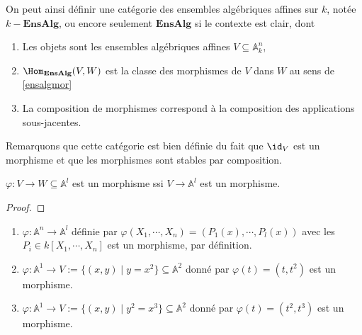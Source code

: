             On peut ainsi définir une catégorie des ensembles algébriques affines sur $k$, notée $k-\mathbf{EnsAlg}$, ou encore seulement $\mathbf{EnsAlg}$ si le contexte est clair, dont
            \begin{enumerate}
                \item Les objets sont les ensembles algébriques affines $V \subseteq \mathbb{A}_k^n$,
                \item $\Hom_\mathbf{EnsAlg}(V,W)$ est la classe des morphismes de $V$ dans $W$ au sens de \ref{ensalgmor}
                \item La composition de morphismes correspond à la composition des applications sous-jacentes.
            \end{enumerate}
            Remarquons que cette catégorie est bien définie du fait que $\id_V$ est un morphisme et que les morphismes sont stables par composition.
            \begin{prop}
                $\varphi : V \to W \subseteq \mathbb{A}^l$ est un morphisme ssi $V \to \mathbb{A}^l$ est un morphisme.
            \end{prop}
            \begin{proof}
            \end{proof}
            \begin{expl}
                \label{ex121}
                \begin{enumerate}
                    \item $\varphi : \mathbb{A}^n \to \mathbb{A}^l$ définie par $\varphi(X_1, \cdots, X_n) = (P_1(x), \cdots, P_l(x))$ avec les $P_i \in k[X_1, \cdots, X_n]$ est un morphisme, par définition.
                    \item \label{ex3} $\varphi : \mathbb{A}^1 \to V := \{(x,y) \mid y = x^2\} \subseteq \mathbb{A}^2$ donné par $\varphi(t) = (t, t^2)$ est un morphisme.
                    \item \label{ex4}$\varphi : \mathbb{A}^1 \to V := \{(x,y) \mid y^2 = x^3\} \subseteq \mathbb{A}^2$ donné par $\varphi(t) = (t^2, t^3)$ est un morphisme.
                \end{enumerate}
            \end{expl}

